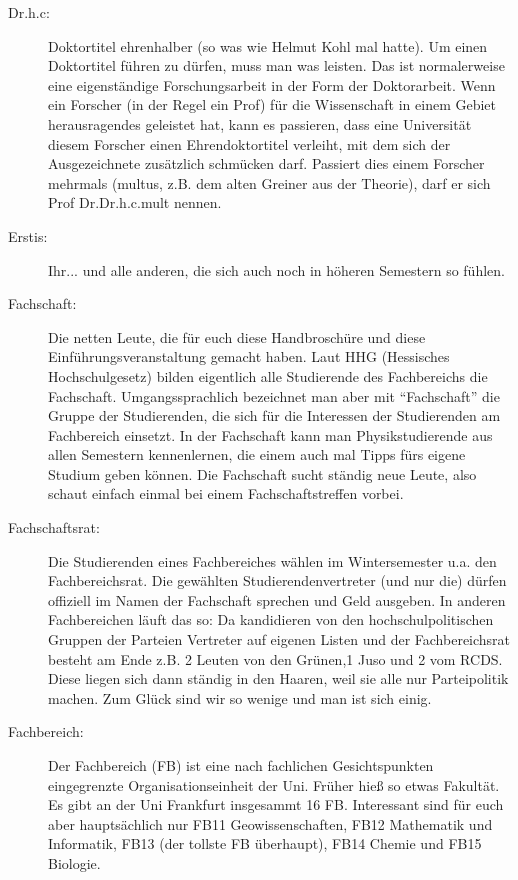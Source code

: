 \begin{description}
    \item[Dr.h.c:] Doktortitel ehrenhalber (so was wie Helmut
Kohl mal hatte). Um einen Doktortitel führen zu dürfen, muss man
was leisten. Das ist normalerweise eine eigenständige
Forschungsarbeit in der Form der Doktorarbeit. Wenn ein Forscher
(in der Regel ein Prof) für die Wissenschaft in einem Gebiet
herausragendes geleistet hat, kann es passieren, dass eine
Universität diesem Forscher einen Ehrendoktortitel verleiht, mit
dem sich der Ausgezeichnete zusätzlich schmücken darf. Passiert
dies einem Forscher mehrmals (multus, z.B. dem alten Greiner aus der Theorie), darf er sich Prof
Dr.Dr.h.c.mult nennen.

\item[Erstis:] Ihr... und alle anderen, die sich auch noch in höheren Semestern so fühlen.

    \item[Fachschaft:]Die netten Leute, die für
euch diese Handbroschüre und diese Einführungsveranstaltung gemacht
haben. Laut HHG (Hessisches Hochschulgesetz) bilden eigentlich
alle Studierende des Fachbereichs die Fachschaft. Umgangssprachlich
bezeichnet man aber mit \enquote{Fachschaft} die Gruppe der Studierenden, die
sich für die Interessen der Studierenden am Fachbereich einsetzt. In der
Fachschaft kann man Physikstudierende aus allen Semestern
kennenlernen, die einem auch mal Tipps fürs eigene Studium geben
können. Die Fachschaft sucht ständig neue Leute, also schaut
einfach einmal bei einem Fachschaftstreffen vorbei.

    \item[Fachschaftsrat:]Die Studierenden eines Fachbereiches wählen im
Wintersemester u.a. den Fachbereichsrat. Die gewählten
Studierendenvertreter (und nur die) dürfen offiziell im Namen der
Fachschaft sprechen und Geld ausgeben. In anderen Fachbereichen
läuft das so: Da kandidieren von den hochschulpolitischen
Gruppen der Parteien Vertreter auf eigenen Listen und der
Fachbereichsrat besteht am Ende z.B. 2 Leuten von den Grünen,1
Juso und 2 vom RCDS. Diese liegen sich dann ständig in den Haaren,
weil sie alle nur Parteipolitik machen. Zum Glück sind wir so
wenige und man ist sich einig.

    \item[Fachbereich:] Der Fachbereich (FB)
ist eine nach fachlichen Gesichtspunkten eingegrenzte
Organisationseinheit der Uni. Früher hieß so etwas Fakultät. Es
gibt an der Uni Frankfurt insgesammt 16 FB. Interessant sind für
euch aber hauptsächlich nur FB11 Geowissenschaften, FB12
Mathematik und Informatik, FB13 (der tollste FB überhaupt), FB14
Chemie und FB15 Biologie.


\end{description}
